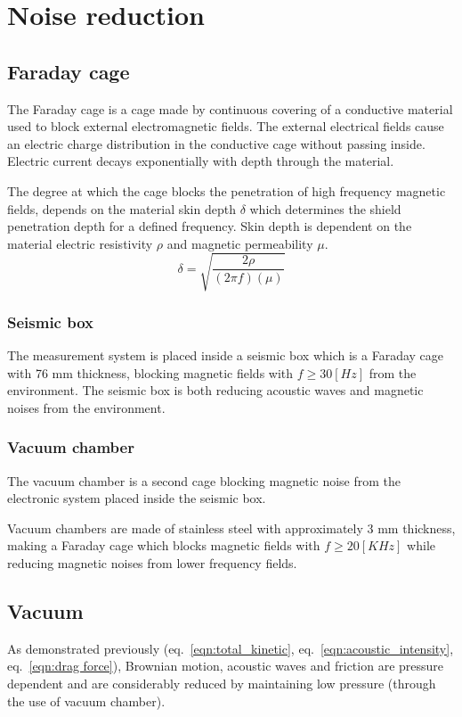 \documentclass[\main/master.tex]{subfiles}
\begin{document}
\section{Noise reduction}
\subsection{Faraday cage}
\par\noindent
The Faraday cage is a cage made by continuous covering of a conductive material used to block external electromagnetic fields. The external electrical fields cause an electric charge distribution in the conductive cage without passing inside. Electric current decays exponentially with depth through the material.

\par\noindent
The degree at which the cage blocks the penetration of high frequency magnetic fields, depends on the material skin depth $\delta$ which determines the shield penetration depth for a defined frequency. Skin depth is dependent on the material electric resistivity $\rho$ and magnetic permeability $\mu$. 
\begin{equation}
\delta = \sqrt{\frac{2\rho}{(2\pi f)(\mu)} }    \label{eqn:skin depth}
\end{equation}

\subsubsection{Seismic box}
The measurement system is placed inside a seismic box which is a Faraday cage with 76 mm thickness, blocking magnetic fields with $f \ge 30 [Hz]$ from the environment. The seismic box is both reducing acoustic waves and magnetic noises from the environment.
\subsubsection{Vacuum chamber}
The vacuum chamber is a second cage blocking magnetic noise from the electronic system placed inside the seismic box.
\par\noindent
Vacuum chambers are made of stainless steel with approximately 3 mm thickness, making a Faraday cage which blocks magnetic fields with $f\ge 20 [KHz]$ while reducing magnetic noises from lower frequency fields.
\subsection{Vacuum}
\par\noindent
As demonstrated previously (eq.~\ref{eqn:total_kinetic}, eq.~\ref{eqn:acoustic_intensity}, eq.~\ref{eqn:drag force}), Brownian motion, acoustic waves and friction are pressure dependent and are considerably reduced by maintaining low pressure (through the use of vacuum chamber).
\end{document}
